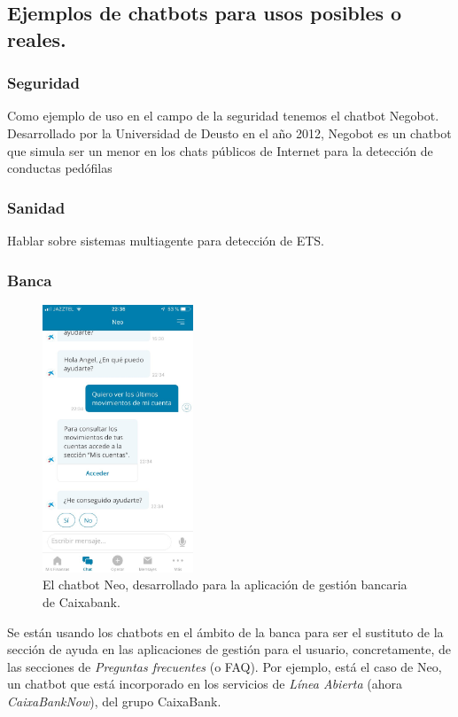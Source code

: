 \documentclass[spanish,12pt, a4paper, twoside]{paper}
\begin{document}
\subsection{Ejemplos de chatbots para usos posibles o reales.}

\subsubsection{Seguridad}

Como ejemplo de uso en el campo de la seguridad tenemos el chatbot Negobot. Desarrollado por la Universidad de Deusto en el año 2012, Negobot es un chatbot que simula ser un menor en los chats públicos de Internet para la detección de conductas pedófilas

\subsubsection{Sanidad}

Hablar sobre sistemas multiagente para detección de ETS.

\subsubsection{Banca}

\begin{figure}
\centering
	\includegraphics[width=0.4\textwidth]{recursos/neoCaixabank}
\caption{El chatbot Neo, desarrollado para la aplicación de gestión bancaria de Caixabank.}
\label{fig:Neo, bot de CaixaBank}
\end{figure}

Se están usando los chatbots en el ámbito de la banca para ser el sustituto de la sección de ayuda en las aplicaciones de gestión para el usuario, concretamente, de las secciones de \emph{Preguntas frecuentes} (o FAQ). Por ejemplo, está el caso de Neo, un chatbot que está incorporado en los servicios de \emph{Línea Abierta} (ahora \emph{CaixaBankNow}), del grupo CaixaBank.
\newline
\end{document}
